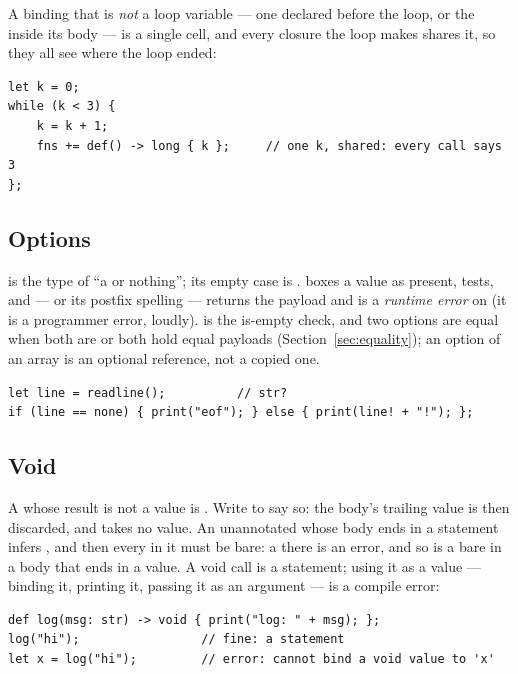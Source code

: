 \noindent A binding that is \emph{not} a loop variable --- one declared
before the loop, or the  inside its body --- is a single cell,
and every closure the loop makes shares it, so they all see where the
loop ended:

\begin{lstlisting}
let k = 0;
while (k < 3) {
    k = k + 1;
    fns += def() -> long { k };     // one k, shared: every call says 3
};
\end{lstlisting}

\subsection{Options}
\label{sec:builtin-option}

 is the type of ``a  or nothing''; its empty case is
.  boxes a value as present, 
tests, and  --- or its postfix spelling  ---
returns the payload and is a \emph{runtime error} on  (it is a
programmer error, loudly).  is the is-empty check, and
two options are equal when both are  or both hold equal payloads (Section~\ref{sec:equality});
an option of an array is an optional reference, not a copied one.

\begin{lstlisting}
let line = readline();          // str?
if (line == none) { print("eof"); } else { print(line! + "!"); };
\end{lstlisting}

\subsection{Void}
\label{sec:void}

A  whose result is not a value is . Write 
to say so: the body's trailing value is then discarded, and 
takes no value. An unannotated  whose body ends in a statement
infers , and then every  in it must be bare: a
 there is an error, and so is a bare  in a body
that ends in a value. A void call is a statement; using it as a value --- binding
it, printing it, passing it as an argument --- is a compile error:

\begin{lstlisting}
def log(msg: str) -> void { print("log: " + msg); };
log("hi");                 // fine: a statement
let x = log("hi");         // error: cannot bind a void value to 'x'
\end{lstlisting}

